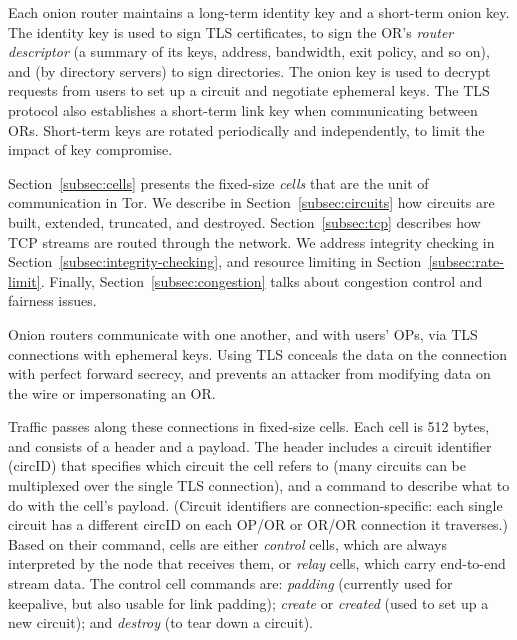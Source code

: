 \documentclass[times,10pt,twocolumn]{article}
\begin{document}
Each onion router maintains a long-term identity key and a short-term
onion key. The identity
key is used to sign TLS certificates, to sign the OR's \emph{router
descriptor} (a summary of its keys, address, bandwidth, exit policy,
and so on), and (by directory servers) to sign directories. %
The onion key is used to decrypt requests
from users to set up a circuit and negotiate ephemeral keys. 
The TLS protocol also establishes a short-term link key when communicating
between ORs. Short-term keys are rotated periodically and
independently, to limit the impact of key compromise.

Section~\ref{subsec:cells} presents the fixed-size
\emph{cells} that are the unit of communication in Tor. We describe
in Section~\ref{subsec:circuits} how circuits are
built, extended, truncated, and destroyed. Section~\ref{subsec:tcp}
describes how TCP streams are routed through the network.  We address
integrity checking in Section~\ref{subsec:integrity-checking},
and resource limiting in Section~\ref{subsec:rate-limit}.
Finally,
Section~\ref{subsec:congestion} talks about congestion control and
fairness issues.

\label{subsec:cells}

Onion routers communicate with one another, and with users' OPs, via
TLS connections with ephemeral keys.  Using TLS conceals the data on
the connection with perfect forward secrecy, and prevents an attacker
from modifying data on the wire or impersonating an OR.

Traffic passes along these connections in fixed-size cells.  Each cell
is 512 bytes, %
and consists of a header and a payload. The header includes a circuit
identifier (circID) that specifies which circuit the cell refers to
(many circuits can be multiplexed over the single TLS connection), and
a command to describe what to do with the cell's payload.  (Circuit
identifiers are connection-specific: each single circuit has a different
circID on each OP/OR or OR/OR connection it traverses.)
Based on their command, cells are either \emph{control} cells, which are
always interpreted by the node that receives them, or \emph{relay} cells,
which carry end-to-end stream data.   The control cell commands are:
\emph{padding} (currently used for keepalive, but also usable for link
padding); \emph{create} or \emph{created} (used to set up a new circuit);
and \emph{destroy} (to tear down a circuit).
\end{document}

